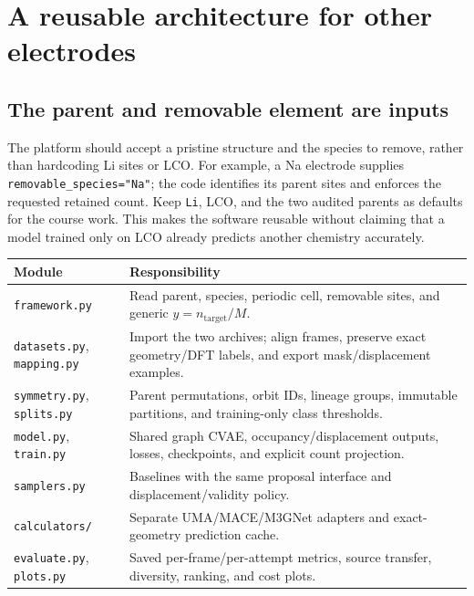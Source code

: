 \clearpage
\section{A reusable architecture for other electrodes}\label{sec:architecture}

\subsection*{The parent and removable element are inputs}
The platform should accept a pristine structure and the species to remove, rather than hardcoding Li sites or LCO. For example, a Na electrode supplies \texttt{removable\_species="Na"}; the code identifies its parent sites and enforces the requested retained count. Keep \texttt{Li}, LCO, and the two audited parents as defaults for the course work. This makes the software reusable without claiming that a model trained only on LCO already predicts another chemistry accurately.

\begin{center}\small
\begin{tabularx}{\linewidth}{@{}p{3.6cm}Y@{}}
\toprule
Module & Responsibility\\
\midrule
\texttt{framework.py} & Read parent, species, periodic cell, removable sites, and generic $y=n_{\mathrm{target}}/M$.\\
\texttt{datasets.py}, \texttt{mapping.py} & Import the two archives; align frames, preserve exact geometry/DFT labels, and export mask/displacement examples.\\
\texttt{symmetry.py}, \texttt{splits.py} & Parent permutations, orbit IDs, lineage groups, immutable partitions, and training-only class thresholds.\\
\texttt{model.py}, \texttt{train.py} & Shared graph CVAE, occupancy/displacement outputs, losses, checkpoints, and explicit count projection.\\
\texttt{samplers.py} & Baselines with the same proposal interface and displacement/validity policy.\\
\texttt{calculators/} & Separate UMA/MACE/M3GNet adapters and exact-geometry prediction cache.\\
\texttt{evaluate.py}, \texttt{plots.py} & Saved per-frame/per-attempt metrics, source transfer, diversity, ranking, and cost plots.\\
\bottomrule
\end{tabularx}
\end{center}

